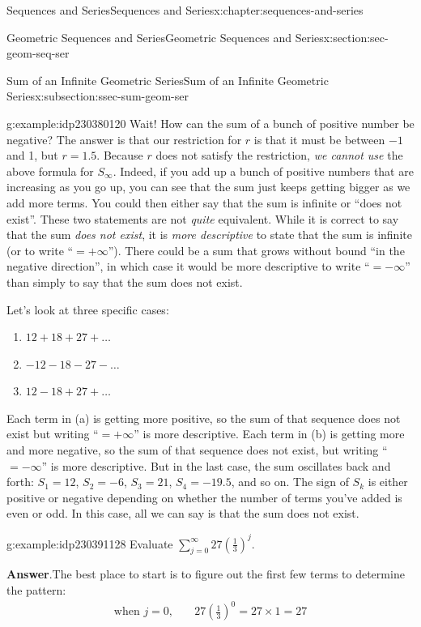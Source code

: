 \documentclass[twoside,10pt,]{book}
\newcommand{\blocktitlefont}{\relax}
\numberwithin{equation}{section}
\newcommand{\amp}{&}
\begin{document}
\begin{chapterptx}{Sequences and Series}{}{Sequences and Series}{}{}{x:chapter:sequences-and-series}
\begin{sectionptx}{Geometric Sequences and Series}{}{Geometric Sequences and Series}{}{}{x:section:sec-geom-seq-ser}
\begin{subsectionptx}{Sum of an Infinite Geometric Series}{}{Sum of an Infinite Geometric Series}{}{}{x:subsection:ssec-sum-geom-ser}
\begin{example}{}{g:example:idp230380120}
Wait!  How can the sum of a bunch of positive number be negative?  The answer is that our restriction for \(r\) is that it must be between \(-1\) and 1, but \(r = 1.5\).  Because \(r\) does not satisfy the restriction, \emph{we cannot use} the above formula for \(S_\infty\).  Indeed, if you add up a bunch of positive numbers that are increasing as you go up, you can see that the sum just keeps getting bigger as we add more terms.  You could then either say that the sum is infinite or ``does not exist''.  These two statements are not \emph{quite} equivalent.  While it is correct to say that the sum \emph{does not exist}, it is \emph{more descriptive} to state that the sum is infinite (or to write ``\(=+\infty\)'').  There could be a sum that grows without bound ``in the negative direction'', in which case it would be more descriptive to write ``\(=-\infty\)'' than simply to say that the sum does not exist.\end{example}
%
\par
Let's look at three specific cases:%
\begin{enumerate}[label=(\alph*)]
\item{}\(\displaystyle 12+18+27+\ldots\)%
\item{}\(\displaystyle -12-18-27-\ldots\)%
\item{}\(\displaystyle 12-18+27+\ldots\)%
\end{enumerate}
Each term in (a) is getting more positive, so the sum of that sequence does not exist but writing ``\(=+\infty\)'' is more descriptive.  Each term in (b) is getting more and more negative, so the sum of that sequence does not exist, but writing ``\(=-\infty\)'' is more descriptive.  But in the last case, the sum oscillates back and forth:  \(S_1 = 12\), \(S_2 = -6\), \(S_3 = 21\), \(S_4 = -19.5\), and so on.  The sign of \(S_k\) is either positive or negative depending on whether the number of terms you've added is even or odd.  In this case, all we can say is that the sum does not exist. \begin{example}{}{g:example:idp230391128}%
Evaluate \(\sum\limits_{j = 0}^\infty  {27{{\left( {\frac{1}{3}} \right)}^j}}\).\par\smallskip%
\noindent\textbf{\blocktitlefont Answer}.\label{g:answer:idp230391512}{}\hypertarget{g:answer:idp230391512}{}\quad{}The best place to start is to figure out the first few terms to determine the pattern:%
\begin{align*}
\text{when } j = 0,\quad \amp 27{\left( {\frac{1}{3}} \right)^0} = 27 \times 1 = 27\\

\end{align*}
\end{example}
\end{subsectionptx}
\end{sectionptx}
\end{chapterptx}
\end{document}
